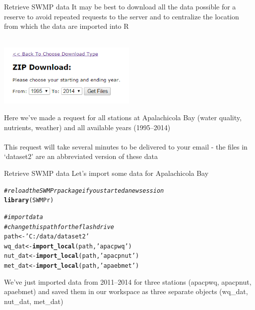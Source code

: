 \documentclass[xcolor=svgnames]{beamer}\usepackage[]{graphicx}\usepackage[]{color}
\makeatletter
\newcommand{\hlstr}[1]{\textcolor[rgb]{0.192,0.494,0.8}{#1}}%
\newcommand{\hlcom}[1]{\textcolor[rgb]{0.678,0.584,0.686}{\textit{#1}}}%
\newcommand{\hlstd}[1]{\textcolor[rgb]{0.345,0.345,0.345}{#1}}%
\newcommand{\hlkwb}[1]{\textcolor[rgb]{0.69,0.353,0.396}{#1}}%
\newcommand{\hlkwd}[1]{\textcolor[rgb]{0.737,0.353,0.396}{\textbf{#1}}}%
\newenvironment{kframe}{%
 \def\at@end@of@kframe{}%
 \ifinner\ifhmode%
  \def\at@end@of@kframe{\end{minipage}}%
  \begin{minipage}{\columnwidth}%
 \fi\fi%
 \def\FrameCommand##1{\hskip\@totalleftmargin \hskip-\fboxsep
 \colorbox{shadecolor}{##1}\hskip-\fboxsep
     \hskip-\linewidth \hskip-\@totalleftmargin \hskip\columnwidth}%
 \MakeFramed {\advance\hsize-\width
   \@totalleftmargin\z@ \linewidth\hsize
   \@setminipage}}%
 {\par\unskip\endMakeFramed%
 \at@end@of@kframe}
\newenvironment{knitrout}{}{} %
\makeatother
\begin{document}
\begin{frame}[t]{Retrieve SWMP data}
It may be best to download all the data possible for a reserve to avoid repeated requests to the server and to centralize the location from which the data are imported into R \\~\\
\centerline{\includegraphics[width = 0.5\textwidth]{zip_eda2.png}}
Here we've made a request for all stations at Apalachicola Bay (water quality, nutrients, weather) and all available years (1995--2014) \\~\\
This request will take several minutes to be delivered to your email - the files in `dataset2' are an abbreviated version of these data
\end{frame}

\begin{frame}[containsverbatim]{Retrieve SWMP data}
Let's import some data for Apalachicola Bay

\begin{knitrout}\scriptsize
{}\color{fgcolor}\begin{kframe}
\begin{alltt}
\hlcom{# reload the SWMPr package if you started a new session}
\hlkwd{library}\hlstd{(SWMPr)}

\hlcom{# import data}
\hlcom{# change this path for the flash drive}
\hlstd{path} \hlkwb{<-} \hlstr{'C:/data/dataset2'}
\hlstd{wq_dat} \hlkwb{<-} \hlkwd{import_local}\hlstd{(path,} \hlstr{'apacpwq'}\hlstd{)}
\hlstd{nut_dat} \hlkwb{<-} \hlkwd{import_local}\hlstd{(path,} \hlstr{'apacpnut'}\hlstd{)}
\hlstd{met_dat} \hlkwb{<-} \hlkwd{import_local}\hlstd{(path,} \hlstr{'apaebmet'}\hlstd{)}
\end{alltt}
\end{kframe}
\end{knitrout}
We've just imported data from 2011--2014 for three stations (apacpwq, apacpnut, apaebmet) and saved them in our workspace as three separate objects (wq\_dat, nut\_dat, met\_dat)
\end{frame}
\end{document}
